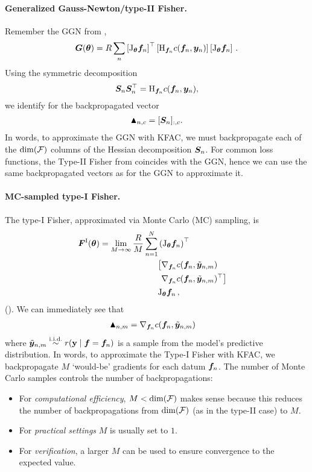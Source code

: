 \paragraph{Generalized Gauss-Newton/type-II Fisher.} Remember the GGN from ,
\begin{align*}
  {\bm{G}}({\bm{\theta}})= R \sum_n
  \left[\mathrm{J}_{{\bm{\theta}}} {\bm{f}}_n\right]^{\top}
  \left[\mathrm{H}_{{\bm{f}}_n} c({\bm{f}}_n, {\bm{y}}_n)
  \right]
  \left[\mathrm{J}_{{\bm{\theta}}} {\bm{f}}_n\right]\,.
\end{align*}
Using the symmetric decomposition
$${\bm{S}}_n {\bm{S}}_n^{\top} = \mathrm{H}_{{\bm{f}}_n} c({\bm{f}}_n, {\bm{y}}_n),$$ we identify for the backpropagated vector
\begin{align*}
  \blacktriangle_{n,c} = [{\bm{S}}_n]_{:,c}.
\end{align*}
In words, to approximate the GGN with KFAC, we must backpropagate each of the $\dim({\mathcal{F}})$ columns of the Hessian decomposition ${\bm{S}}_n$.
For common loss functions, the Type-II Fisher from  coincides with the GGN, hence we can use the same backpropagated vectors as for the GGN to approximate it.

\paragraph{MC-sampled type-I Fisher.}
The type-I Fisher, approximated via Monte Carlo (MC) sampling, is
\begin{align*}
  &\begin{aligned}
    {\bm{F}}^{\text{I}}({\bm{\theta}}) = \lim_{M \to \infty} \frac{R}{M} \sum_{n=1}^N
    &\left( \mathrm{J}_{{\bm{\theta}}} {\bm{f}}_n\right)^{\top} \\
    &
      \begin{aligned}
        \big[
        &\nabla_{{\bm{f}}_n} c({\bm{f}}_n, \tilde{{\bm{y}}}_{n,m}) \\
        &\nabla_{{\bm{f}}_n} c({\bm{f}}_n, \tilde{{\bm{y}}}_{n,m})^{\top}
          \big]
      \end{aligned} \\
    &\mathrm{J}_{{\bm{\theta}}} {\bm{f}}_n\,,
  \end{aligned}
\end{align*}
().
We can immediately see that
\begin{align*}
  \blacktriangle_{n,m}
  &= \nabla_{{\bm{f}}_n}  c({\bm{f}}_n, \tilde{{\bm{y}}}_{n,m})
\end{align*}
where $\tilde{\vy}_{n,m} \stackrel{\text{\iid}}{\sim} r(\rvy \mid \vf = \vf_n)$ is a sample from the model's predictive distribution.
In words, to approximate the Type-I Fisher with KFAC, we backpropagate $M$ `would-be' gradients for each datum ${\bm{f}}_n$.
The number of Monte Carlo samples controls the number of backpropagations:
\begin{itemize}
\item For \emph{computational efficiency}, $M<\dim({\mathcal{F}})$ makes sense because this reduces the number of backpropagations from $\dim({\mathcal{F}})$ (as in the type-II case) to $M$.
\item For \emph{practical settings} $M$ is usually set to $1$.
\item For \emph{verification}, a larger $M$ can be used to ensure convergence to the expected value.
\end{itemize}

